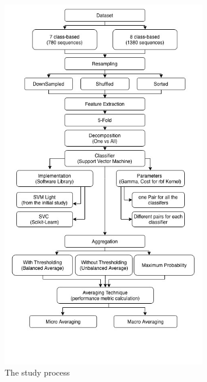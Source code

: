 \begin{Supporting Materials}

\begin{figure}[ht]
    \centering
    \includegraphics[width=0.80\textwidth]{figures/13studyProcess.jpg}
    \caption{The study process}
    \label{fig:studyProcess}
\end{figure}

\end{Supporting Materials}
